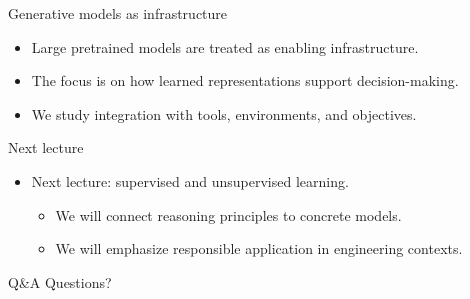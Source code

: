 \documentclass[12pt]{beamer}
\begin{document}
\begin{frame}{Generative models as infrastructure}
  \begin{itemize}
    \item Large pretrained models are treated as enabling infrastructure.
    \item The focus is on how learned representations support decision-making.
    \item We study integration with tools, environments, and objectives.
  \end{itemize}
\end{frame}

\begin{frame}{Next lecture}
  \begin{itemize}
    \item Next lecture: supervised and unsupervised learning.
      \begin{itemize}
        \item We will connect reasoning principles to concrete models.
        \item We will emphasize responsible application in engineering contexts.
      \end{itemize}
  \end{itemize}
\end{frame}

\begin{frame}{Q\&A}
  \centering
  Questions?
\end{frame}
\end{document}
